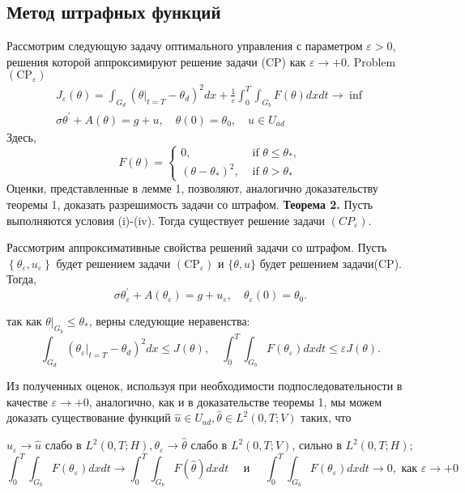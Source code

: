 \subsection{Метод штрафных функций}\label{subsec:ch3:sec3:subsec4}
Рассмотрим следующую задачу оптимального управления с параметром $\varepsilon>0$,
решения которой аппроксимируют решение задачи (CP) как $\varepsilon \rightarrow+0$.
Problem $\left(\mathrm{CP}_{\varepsilon}\right)$
\[
    \begin{gathered}
        J_{\varepsilon}(\theta)=\int_{G_{d}}
        \left(\left.\theta\right|_{t=T}-\theta_{d}\right)^{2} d x
        + \frac{1}{\varepsilon} \int_{0}^{T} \int_{G_{b}} F(\theta) d x d t \rightarrow \inf \\
        \sigma \theta^{\prime}+A(\theta)=g+u, \quad \theta(0)=\theta_{0}, \quad u \in U_{a d}
    \end{gathered}
\]
Здесь,
\[
    F(\theta)=
    \begin{cases}
        0, & \text { if } \theta \leq \theta_{*}, \\
        \left(\theta-\theta_{*}\right)^{2}, & \text { if } \theta>\theta_{*}
    \end{cases}
\]
Оценки, представленные в лемме 1, позволяют, аналогично
доказательству теоремы 1, доказать разрешимость задачи со штрафом.
\textbf{Теорема 2.} Пусть выполняются условия (i)-(iv).
Тогда существует решение задачи $\left(C P_{\varepsilon}\right)$.

Рассмотрим аппроксимативные свойства решений задачи со штрафом.
Пусть $\left\{\theta_{\varepsilon}, u_{\varepsilon}\right\}$ будет решением задачи
$\left(\mathrm{CP}_{\varepsilon}\right)$ и $\{\theta, u\}$ будет решением задачи(CP).
Тогда,
\[
    \sigma \theta_{\varepsilon}^{\prime}+A\left(\theta_{\varepsilon}\right)=g+u_{\varepsilon},
    \quad \theta_{\varepsilon}(0)=\theta_{0}.
\]

так как $\left.\theta\right|_{G_{b}} \leq \theta_{*}$, верны следующие неравенства:
\[
    \int_{G_{d}}\left(\left.\theta_{\varepsilon}\right|_{t=T}-\theta_{d}\right)^{2} d x \leq J(\theta),
    \quad \int_{0}^{T} \int_{G_{b}} F\left(\theta_{\varepsilon}\right) d x d t \leq \varepsilon J(\theta).
\]

Из полученных оценок, используя при необходимости подпоследовательности в качестве
$\varepsilon \rightarrow+0$, аналогично, как и в доказательстве теоремы 1,
мы можем доказать существование функций
$\widehat{u} \in U_{a d}, \widehat{\theta} \in L^{2}(0, T ; V)$ таких, что

$u_{\varepsilon} \rightarrow \widehat{u}$ слабо в
$L^{2}(0, T ; H), \theta_{\varepsilon} \rightarrow \widehat{\theta}$ слабо в $L^{2}(0, T ; V)$,
сильно в $L^{2}(0, T ; H)$;
\[
    \int_{0}^{T} \int_{G_{b}} F\left(\theta_{\varepsilon}\right) d x d t \rightarrow \int_{0}^{T}
    \int_{G_{b}} F(\widehat{\theta}) dx dt \quad \text { и } \quad \int_{0}^{T} \int_{G_{b}}
    F\left(\theta_{\varepsilon}\right) dx dt \rightarrow 0, \text { как } \varepsilon \rightarrow+0
\]

